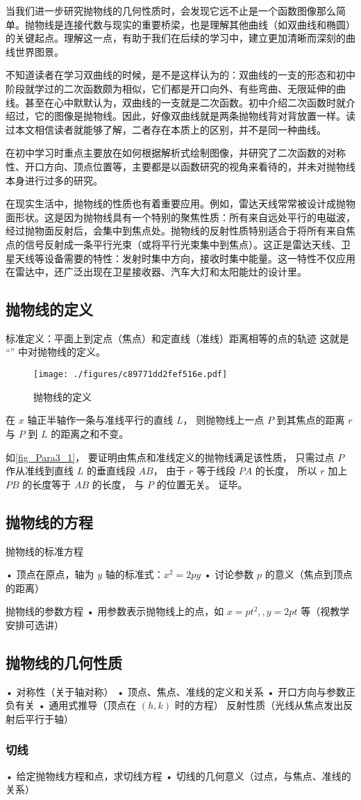 当我们进一步研究抛物线的几何性质时，会发现它远不止是一个函数图像那么简单。抛物线是连接代数与现实的重要桥梁，也是理解其他曲线（如双曲线和椭圆）的关键起点。理解这一点，有助于我们在后续的学习中，建立更加清晰而深刻的曲线世界图景。



不知道读者在学习双曲线的时候，是不是这样认为的：双曲线的一支的形态和初中阶段就学过的二次函数颇为相似，它们都是开口向外、有些弯曲、无限延伸的曲线。甚至在心中默默认为，双曲线的一支就是二次函数。初中介绍二次函数时就介绍过，它的图像是抛物线。因此，好像双曲线就是两条抛物线背对背放置一样。读过本文相信读者就能够了解，二者存在本质上的区别，并不是同一种曲线。

在初中学习时重点主要放在如何根据解析式绘制图像，并研究了二次函数的对称性、开口方向、顶点位置等，主要都是以函数研究的视角来看待的，并未对抛物线本身进行过多的研究。

在现实生活中，抛物线的性质也有着重要应用。例如，雷达天线常常被设计成抛物面形状。这是因为抛物线具有一个特别的聚焦性质：所有来自远处平行的电磁波，经过抛物面反射后，会集中到焦点处。抛物线的反射性质特别适合于将所有来自焦点的信号反射成一条平行光束（或将平行光束集中到焦点）。这正是雷达天线、卫星天线等设备需要的特性：发射时集中方向，接收时集中能量。这一特性不仅应用在雷达中，还广泛出现在卫星接收器、汽车大灯和太阳能灶的设计里。

\subsection{抛物线的定义}
标准定义：平面上到定点（焦点）和定直线（准线）距离相等的点的轨迹
这就是 “” 中对抛物线的定义。
\begin{figure}[ht]
\centering
\texttt{[image: ./figures/c89771dd2fef516e.pdf]}
\caption{抛物线的定义} \label{fig_Para3_1}
\end{figure}

在 $x$ 轴正半轴作一条与准线平行的直线 $L$， 则抛物线上一点 $P$ 到其焦点的距离 $r$ 与 $P$ 到 $L$ 的距离之和不变。

如\autoref{fig_Para3_1}， 要证明由焦点和准线定义的抛物线满足该性质， 只需过点 $P$ 作从准线到直线 $L$ 的垂直线段 $AB$， 由于 $r$ 等于线段 $PA$ 的长度， 所以 $r$ 加上 $PB$ 的长度等于 $AB$ 的长度， 与 $P$ 的位置无关。 证毕。


\subsection{抛物线的方程}
\begin{theorem}{抛物线的标准方程}

\end{theorem}
	•	顶点在原点，轴为 $y$ 轴的标准式：$x^2=2py$
	•	讨论参数 $p$ 的意义（焦点到顶点的距离）
\begin{theorem}{抛物线的参数方程}
	•	用参数表示抛物线上的点，如 $x=pt^2,,y=2pt$ 等（视教学安排可选讲）
\end{theorem}

\subsection{抛物线的几何性质}
	•	对称性（关于轴对称）
	•	顶点、焦点、准线的定义和关系
	•	开口方向与参数正负有关
	•	通用式推导（顶点在 $(h,k)$ 时的方程）
    反射性质（光线从焦点发出反射后平行于轴）
\subsubsection{切线}
	•	给定抛物线方程和点，求切线方程
	•	切线的几何意义（过点，与焦点、准线的关系）
